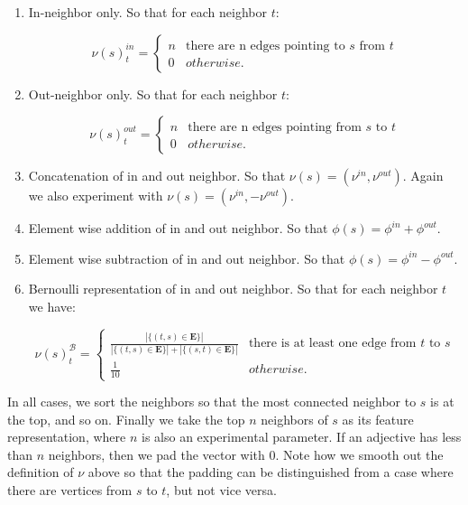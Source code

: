 \begin{enumerate}
	\item In-neighbor only. So that for each neighbor $t$:

		\[   
		\nu(s)^{in}_t = \left\{
		\begin{array}{ll}
		      n & \text{there are n edges pointing to $s$ from $t$} \\
		      0 & otherwise.
		\end{array} 
		\right.
		\]

	\item Out-neighbor only. So that for each neighbor $t$:

		\[   
		\nu(s)^{out}_t = \left\{
		\begin{array}{ll}
		      n & \text{there are n edges pointing from $s$ to $t$} \\
		      0 & otherwise.
		\end{array} 
		\right. 
		\]

	\item Concatenation of in and out neighbor. So that $\nu(s) = (\nu^{in}, \nu^{out})$. Again we also experiment with $\nu(s) = (\nu^{in}, -\nu^{out})$.

	\item Element wise addition of in and out neighbor. So that $\phi(s) = \phi^{in} + \phi^{out}$.
	
	\item Element wise subtraction of in and out neighbor. So that $\phi(s) = \phi^{in} - \phi^{out}$.

	\item Bernoulli representation of in and out neighbor. So that for each neighbor $t$ we have:

		\[   
			\nu(s)^{\mathcal{B}}_t = \left\{
			\begin{array}{ll}
			      \frac{|\{(t,s) \in \pmb{E}\}|}{|\{(t,s) \in \pmb{E}\}| + |\{(s,t) \in \pmb{E}\}|} & \text{there is at least one edge from $t$ to $s$} \\
			      \frac{1}{10} & otherwise.
			\end{array} 
			\right. 
		\]

\end{enumerate}

In all cases, we sort the neighbors so that the most connected neighbor to $s$ is at the top, and so on. Finally we take the top $n$ neighbors of $s$ as its feature representation, where $n$ is also an experimental parameter. If an adjective has less than $n$ neighbors, then we pad the vector with $0$. Note how we smooth out the definition of $\nu$ above so that the padding can be distinguished from a case where there are vertices from $s$ to $t$, but not vice versa.

